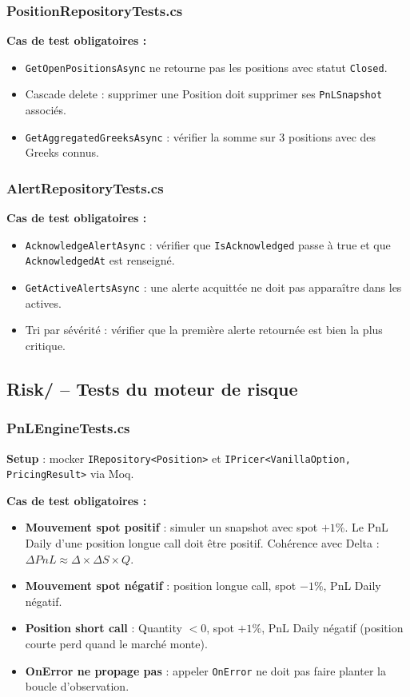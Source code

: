 \documentclass[a4paper,11pt]{article}
\newcommand{\cs}[1]{\texttt{\color{codeinline}#1}}
\begin{document}
\subsubsection{PositionRepositoryTests.cs}

\textbf{Cas de test obligatoires :}
\begin{itemize}
  \item \cs{GetOpenPositionsAsync} ne retourne pas les positions avec statut
        \cs{Closed}.
  \item Cascade delete : supprimer une Position doit supprimer ses
        \cs{PnLSnapshot} associés.
  \item \cs{GetAggregatedGreeksAsync} : vérifier la somme sur 3 positions
        avec des Greeks connus.
\end{itemize}

\subsubsection{AlertRepositoryTests.cs}

\textbf{Cas de test obligatoires :}
\begin{itemize}
  \item \cs{AcknowledgeAlertAsync} : vérifier que \cs{IsAcknowledged}
        passe à true et que \cs{AcknowledgedAt} est renseigné.
  \item \cs{GetActiveAlertsAsync} : une alerte acquittée ne doit pas
        apparaître dans les actives.
  \item Tri par sévérité : vérifier que la première alerte
        retournée est bien la plus critique.
\end{itemize}

\subsection{Risk/ -- Tests du moteur de risque}

\subsubsection{PnLEngineTests.cs}

\textbf{Setup} : mocker \cs{IRepository<Position>} et
\cs{IPricer<VanillaOption, PricingResult>} via Moq.

\textbf{Cas de test obligatoires :}
\begin{itemize}
  \item \textbf{Mouvement spot positif} : simuler un snapshot avec spot
        $+1\%$. Le PnL Daily d'une position longue call doit être positif.
        Cohérence avec Delta : $\Delta PnL \approx \Delta \times \Delta S \times Q$.
  \item \textbf{Mouvement spot négatif} : position longue call, spot $-1\%$,
        PnL Daily négatif.
  \item \textbf{Position short call} : Quantity $< 0$, spot $+1\%$, PnL Daily
        négatif (position courte perd quand le marché monte).
  \item \textbf{OnError ne propage pas} : appeler \cs{OnError} ne doit pas
        faire planter la boucle d'observation.
\end{itemize}
\end{document}
